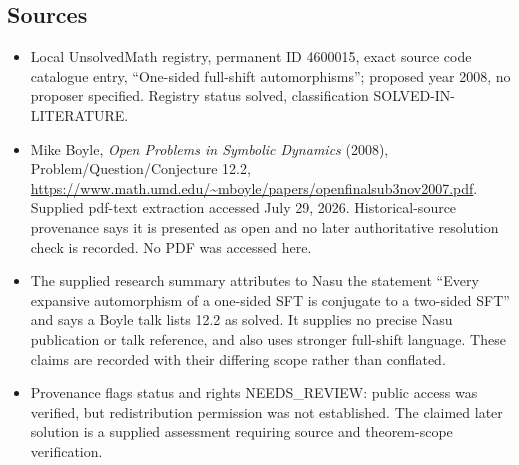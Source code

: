 \documentclass[11pt]{article}
\begin{document}
\subsection{Sources}
\begin{itemize}
\item Local UnsolvedMath registry, permanent ID 4600015, exact source code catalogue entry, ``One-sided full-shift automorphisms''; proposed year 2008, no proposer specified. Registry status solved, classification SOLVED-IN-LITERATURE.
\item Mike Boyle, \emph{Open Problems in Symbolic Dynamics} (2008), Problem/Question/Conjecture 12.2, \url{https://www.math.umd.edu/~mboyle/papers/openfinalsub3nov2007.pdf}. Supplied pdf-text extraction accessed July 29, 2026. Historical-source provenance says it is presented as open and no later authoritative resolution check is recorded. No PDF was accessed here.
\item The supplied research summary attributes to Nasu the statement ``Every expansive automorphism of a one-sided SFT is conjugate to a two-sided SFT'' and says a Boyle talk lists 12.2 as solved. It supplies no precise Nasu publication or talk reference, and also uses stronger full-shift language. These claims are recorded with their differing scope rather than conflated.
\item Provenance flags status and rights NEEDS\_REVIEW: public access was verified, but redistribution permission was not established. The claimed later solution is a supplied assessment requiring source and theorem-scope verification.
\end{itemize}
\end{document}

